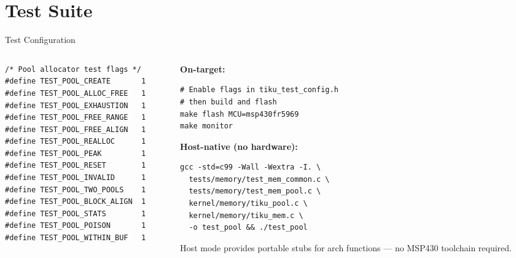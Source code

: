 \documentclass[aspectratio=169, 10pt]{beamer}
\begin{document}
\section{Test Suite}

\begin{frame}[fragile]{Test Configuration}
\begin{columns}[T]
\begin{column}{0.48\textwidth}
\begin{lstlisting}[style=cstyle, title={tests/tiku\_test\_config.h}]
/* Pool allocator test flags */
#define TEST_POOL_CREATE       1
#define TEST_POOL_ALLOC_FREE   1
#define TEST_POOL_EXHAUSTION   1
#define TEST_POOL_FREE_RANGE   1
#define TEST_POOL_FREE_ALIGN   1
#define TEST_POOL_REALLOC      1
#define TEST_POOL_PEAK         1
#define TEST_POOL_RESET        1
#define TEST_POOL_INVALID      1
#define TEST_POOL_TWO_POOLS    1
#define TEST_POOL_BLOCK_ALIGN  1
#define TEST_POOL_STATS        1
#define TEST_POOL_POISON       1
#define TEST_POOL_WITHIN_BUF   1
\end{lstlisting}
\end{column}

\begin{column}{0.48\textwidth}
\textbf{On-target:}
\begin{lstlisting}[style=bashstyle]
# Enable flags in tiku_test_config.h
# then build and flash
make flash MCU=msp430fr5969
make monitor
\end{lstlisting}

\vspace{0.5em}
\textbf{Host-native (no hardware):}
\begin{lstlisting}[style=bashstyle]
gcc -std=c99 -Wall -Wextra -I. \
  tests/memory/test_mem_common.c \
  tests/memory/test_mem_pool.c \
  kernel/memory/tiku_pool.c \
  kernel/memory/tiku_mem.c \
  -o test_pool && ./test_pool
\end{lstlisting}

\vspace{0.3em}
Host mode provides portable stubs for arch functions ---
no MSP430 toolchain required.
\end{column}
\end{columns}
\end{frame}
\end{document}
